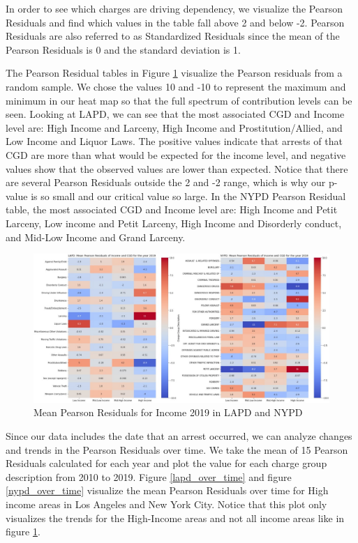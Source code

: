 \documentclass{article}
\begin{document}
In order to see which charges are driving dependency, we visualize the Pearson Residuals and find which values in the table fall above 2 and below -2. Pearson Residuals are also referred to as Standardized Residuals since the mean of the Pearson Residuals is 0 and the standard deviation is 1.

The Pearson Residual tables in Figure \ref{heatmap} visualize the Pearson residuals from a random sample. We chose the values 10 and -10 to represent the maximum and minimum in our heat map so that the full spectrum of contribution levels can be seen. Looking at LAPD, we can see that the most associated CGD and Income level are: High Income and Larceny, High Income and Prostitution/Allied, and Low Income and Liquor Laws. The positive values indicate that arrests of that CGD are more than what would be expected for the income level, and negative values show that the observed values are lower than expected. Notice that there are several Pearson Residuals outside the 2 and -2 range, which is why our p-value is so small and our critical value so large. In the NYPD Pearson Residual table, the most associated CGD and Income level are: High Income and Petit Larceny, Low income and Petit Larceny, High Income and Disorderly conduct, and Mid-Low Income and Grand Larceny.






\begin{figure}[!ht]
    \centering
    \includegraphics[scale = .7]{Graphics/LAPD_NYPD_heatmap_mean_pearson_residuals_2019.jpg}
    \caption{Mean Pearson Residuals for Income 2019 in LAPD and NYPD}
  \label{heatmap}
\end{figure}

Since our data includes the date that an arrest occurred, we can analyze changes and trends in the Pearson Residuals over time. We take the mean of 15 Pearson Residuals calculated for each year and plot the value for each charge group description from 2010 to 2019. Figure \ref{lapd_over_time} and figure \ref{nypd_over_time} visualize the mean Pearson Residuals over time for High income areas in Los Angeles and  New York City. Notice that this plot only visualizes the trends for the High-Income areas and not all income areas like in figure \ref{heatmap}.
\end{document}
